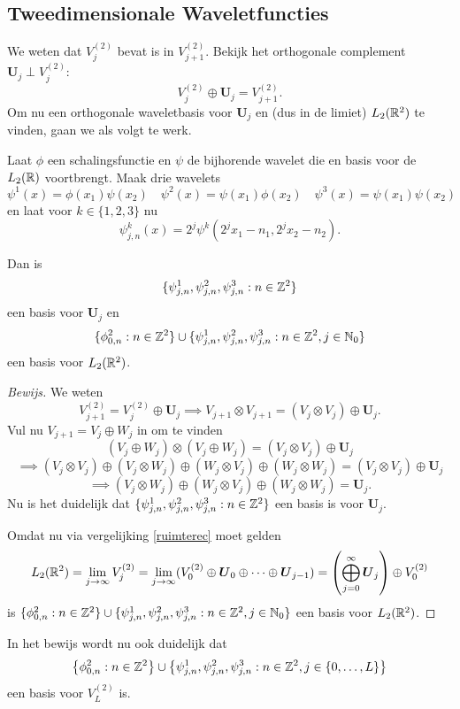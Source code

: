\subsection{Tweedimensionale Waveletfuncties}
We weten dat $V_j^{(2)}$ bevat is in $V_{j+1}^{(2)}$. Bekijk het orthogonale complement $\boldsymbol{U}_j \perp V_j^{(2)}$:
\begin{equation}
  \label{2d_ruimte_rec}
  V_j^{(2)} \oplus \boldsymbol{U}_j = V_{j+1}^{(2)}.
\end{equation}
Om nu een orthogonale waveletbasis voor $\boldsymbol{U}_j$ en (dus in de limiet) $L_2(\mathbb{R}^2)$ te vinden, gaan we als volgt te werk.
\begin{stelling}
\label{mallatbasis}
  Laat $\phi$ een schalingsfunctie en $\psi$ de bijhorende wavelet die en basis voor de $L_2(\mathbb{R})$ voortbrengt. Maak drie wavelets
  \begin{equation}
    \label{psi_k_defs}
    \psi^1(x) = \phi(x_1)\psi(x_2) \quad \psi^2(x) = \psi(x_1) \phi(x_2) \quad \psi^3(x) = \psi(x_1)\psi(x_2)
  \end{equation}
  en laat voor $k \in \{1,2,3\}$ nu
  \[
  \psi^k_{j,n}(x) = 2^j \psi^k\left( 2^jx_1 - n_1, 2^j x_2 - n_2 \right).
  \]

  Dan is
  \[
  \{ \psi^1_{j,n}, \psi^2_{j,n}, \psi^3_{j,n}: n \in \mathbb{Z}^2 \}
  \] een basis voor $\boldsymbol{U}_j$
  en
  \[
  \{ \phi_{0, n}^2: n \in \mathbb{Z}^2 \} \cup \{ \psi^1_{j,n}, \psi^2_{j,n}, \psi^3_{j,n}: n \in \mathbb{Z}^2, j \in \mathbb{N}_0 \}
  \] een basis voor $L_2(\mathbb{R}^2)$.
\end{stelling}
\begin{proof}[Bewijs]
  We weten
  \[
  V_{j+1}^{(2)} = V_j^{(2)} \oplus \boldsymbol{U}_j \implies V_{j+1} \otimes V_{j+1} = ( V_j \otimes V_j ) \oplus \boldsymbol{U}_j.
  \]
  Vul nu $V_{j+1} = V_j \oplus W_j$ in om te vinden
  \[
  ( V_j \oplus W_j ) \otimes (V_j \oplus W_j ) = (V_j \otimes V_j) \oplus \boldsymbol{U}_j
  \]
  \[
  \implies (V_j \otimes V_j) \oplus (V_j \otimes W_j) \oplus (W_j \otimes V_j) \oplus (W_j \otimes W_j) = (V_j \otimes V_j) \oplus \boldsymbol{U}_j
  \]
  \[
  \implies (V_j \otimes W_j) \oplus (W_j \otimes V_j) \oplus (W_j \otimes W_j) = \boldsymbol{U}_j.
  \]
  Nu is het duidelijk dat $\{ \psi^1_{j,n}, \psi^2_{j,n}, \psi^3_{j,n}: n \in \mathbb{Z}^2 \}$ een basis is voor $\boldsymbol{U}_j$.

Omdat nu via vergelijking \ref{ruimterec} moet gelden
\[
	L_2(\mathbb{R}^2) = \lim_{j \to \infty} V_j^{(2)} = \lim_{j \to \infty} ( V_0^{(2)} \oplus \boldsymbol{U}_0 \oplus \cdots \oplus \boldsymbol{U}_{j-1} ) = \left( \bigoplus_{j=0}^\infty \boldsymbol{U}_j \right) \oplus V_0^{(2)}
\]
is $\{ \phi_{0, n}^2: n \in \mathbb{Z}^2 \} \cup \{ \psi^1_{j,n}, \psi^2_{j,n}, \psi^3_{j,n}: n \in \mathbb{Z}^2, j \in \mathbb{N}_0 \}$ een basis voor $L_2(\mathbb{R}^2)$.
\end{proof}
\begin{gevolg}
In het bewijs wordt nu ook duidelijk dat 
\[
	\left\{ \phi_{0, n}^2: n \in \mathbb{Z}^2 \right\} \cup \left\{ \psi^1_{j,n}, \psi^2_{j,n}, \psi^3_{j,n}: n \in \mathbb{Z}^2, j \in \{0, \ldots, L \}  \right\}
\]
een basis voor $V_L^{(2)}$ is.
\end{gevolg}

